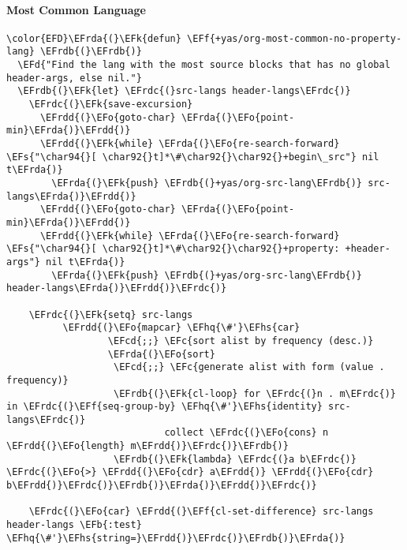 \documentclass{article}
\newcommand{\EFc}[1]{\textcolor{EFc}{#1}} %
\newcommand{\EFcd}[1]{\textcolor{EFcd}{#1}} %
\newcommand{\EFs}[1]{\textcolor{EFs}{#1}} %
\newcommand{\EFd}[1]{\textcolor{EFd}{#1}} %
\newcommand{\EFk}[1]{\textcolor{EFk}{#1}} %
\newcommand{\EFb}[1]{\textcolor{EFb}{#1}} %
\newcommand{\EFf}[1]{\textcolor{EFf}{#1}} %
\newcommand{\EFo}[1]{\textcolor{EFo}{#1}} %
\newcommand{\EFhq}[1]{#1} %
\newcommand{\EFhs}[1]{\textcolor{EFhs}{#1}} %
\newcommand{\EFrda}[1]{\textcolor{EFrda}{#1}} %
\newcommand{\EFrdb}[1]{\textcolor{EFrdb}{#1}} %
\newcommand{\EFrdc}[1]{\textcolor{EFrdc}{#1}} %
\newcommand{\EFrdd}[1]{\textcolor{EFrdd}{#1}} %
\begin{document}
\paragraph{Most Common Language}
\label{sec:org81ef86f}
\begin{Code}
\begin{Verbatim}
\color{EFD}\EFrda{(}\EFk{defun} \EFf{+yas/org-most-common-no-property-lang} \EFrdb{(}\EFrdb{)}
  \EFd{"Find the lang with the most source blocks that has no global header-args, else nil."}
  \EFrdb{(}\EFk{let} \EFrdc{(}src-langs header-langs\EFrdc{)}
    \EFrdc{(}\EFk{save-excursion}
      \EFrdd{(}\EFo{goto-char} \EFrda{(}\EFo{point-min}\EFrda{)}\EFrdd{)}
      \EFrdd{(}\EFk{while} \EFrda{(}\EFo{re-search-forward} \EFs{"\char94{}[ \char92{}t]*\#\char92{}\char92{}+begin\_src"} nil t\EFrda{)}
        \EFrda{(}\EFk{push} \EFrdb{(}+yas/org-src-lang\EFrdb{)} src-langs\EFrda{)}\EFrdd{)}
      \EFrdd{(}\EFo{goto-char} \EFrda{(}\EFo{point-min}\EFrda{)}\EFrdd{)}
      \EFrdd{(}\EFk{while} \EFrda{(}\EFo{re-search-forward} \EFs{"\char94{}[ \char92{}t]*\#\char92{}\char92{}+property: +header-args"} nil t\EFrda{)}
        \EFrda{(}\EFk{push} \EFrdb{(}+yas/org-src-lang\EFrdb{)} header-langs\EFrda{)}\EFrdd{)}\EFrdc{)}

    \EFrdc{(}\EFk{setq} src-langs
          \EFrdd{(}\EFo{mapcar} \EFhq{\#'}\EFhs{car}
                  \EFcd{;;} \EFc{sort alist by frequency (desc.)}
                  \EFrda{(}\EFo{sort}
                   \EFcd{;;} \EFc{generate alist with form (value . frequency)}
                   \EFrdb{(}\EFk{cl-loop} for \EFrdc{(}n . m\EFrdc{)} in \EFrdc{(}\EFf{seq-group-by} \EFhq{\#'}\EFhs{identity} src-langs\EFrdc{)}
                            collect \EFrdc{(}\EFo{cons} n \EFrdd{(}\EFo{length} m\EFrdd{)}\EFrdc{)}\EFrdb{)}
                   \EFrdb{(}\EFk{lambda} \EFrdc{(}a b\EFrdc{)} \EFrdc{(}\EFo{>} \EFrdd{(}\EFo{cdr} a\EFrdd{)} \EFrdd{(}\EFo{cdr} b\EFrdd{)}\EFrdc{)}\EFrdb{)}\EFrda{)}\EFrdd{)}\EFrdc{)}

    \EFrdc{(}\EFo{car} \EFrdd{(}\EFf{cl-set-difference} src-langs header-langs \EFb{:test} \EFhq{\#'}\EFhs{string=}\EFrdd{)}\EFrdc{)}\EFrdb{)}\EFrda{)}

\end{Verbatim}
\end{Code}
\end{document}
